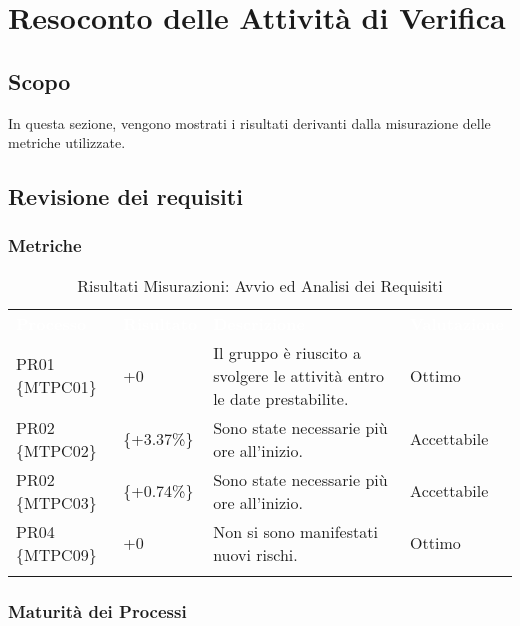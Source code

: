 \section{Resoconto delle Attività di Verifica}
\label{Resoconto}
\subsection{Scopo}

In questa sezione, vengono mostrati i risultati derivanti dalla misurazione delle metriche utilizzate.

\subsection{Revisione dei requisiti}


\subsubsection{Metriche}

\begin{longtable}{|C{.16\textwidth}|C{.16\textwidth}|C{.36\textwidth}|C{.20\textwidth}|}
\hline
{}\textbf{\textcolor{white}{Processo}} & \textbf{\textcolor{white}{Risultato}} & \textbf{\textcolor{white}{Descrizione}} & \textbf{\textcolor{white}{Valutazione}}\\
PR01 \{MTPC01\} & +0 & Il gruppo è riuscito a svolgere le attività entro le date prestabilite. & Ottimo \\
\hline

PR02 \{MTPC02\} &  \{+3.37\%\} & Sono state necessarie più ore all'inizio. & Accettabile\\
\hline

PR02 \{MTPC03\} &  \{+0.74\%\} & Sono state necessarie più ore all'inizio. & Accettabile\\
\hline

PR04 \{MTPC09\} & +0 & Non si sono manifestati nuovi rischi. & Ottimo\\
\hline

\caption{Risultati Misurazioni: Avvio ed Analisi dei Requisiti}
\label{ris:aar}
\end{longtable}

\subsubsection{Maturità dei Processi}

